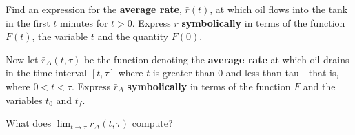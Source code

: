 \documentclass{ximera}
\begin{document}
\begin{exercise}
\begin{exercise}
\begin{exercise}
\begin{exercise}
\begin{exercise}
\begin{exercise}
\begin{exercise}
Find an expression for the \textbf{average rate}, $\bar{r}(t)$, at which oil flows into the tank in the first $t$ minutes for $t>0$. Express $\bar{r}$ \textbf{symbolically} in terms of the function $F(t)$, the variable $t$ and the quantity $F(0)$.
\begin{multipleChoice}
\end{multipleChoice}
\begin{exercise}
Now let $\bar{r}_{\Delta}(t,\tau)$ be the function denoting the \textbf{average rate} at which oil drains in the time interval $[t,\tau]$ where $t$ is greater than $0$ and less than tau---that is, where $0<t<\tau$. Express $\bar{r}_{\Delta}$ \textbf{symbolically} in terms of the function $F$ and the variables $t_0$ and $t_f$.
\begin{multipleChoice}
\end{multipleChoice}
\begin{exercise}
  What does $\lim_{t\to\tau} \bar{r}_\Delta(t,\tau)$ compute?
    \begin{selectAll}
    \end{selectAll}
\end{exercise}
\end{exercise}
\end{exercise}
\end{exercise}
\end{exercise}
\end{exercise}
\end{exercise}
\end{exercise}
\end{exercise}
\end{document}
